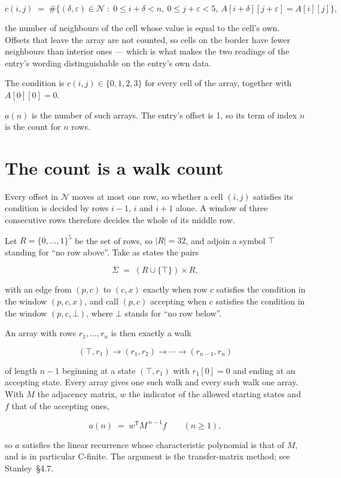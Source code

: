 \documentclass[11pt]{article}
\theoremstyle{definition}
\begin{document}
\[c(i,j) \;=\; \#\bigl\{(\delta,\varepsilon)\in\mathcal{N} \;:\; 0\le i+\delta<n,\ 0\le j+\varepsilon<5,\ A[i+\delta][j+\varepsilon] = A[i][j]\bigr\},\]

the number of neighbours of the cell whose value is equal to the cell's own. Offsets that leave the array are not counted, so cells on the border have fewer neighbours than interior ones --- which is what makes the two readings of the entry's wording distinguishable on the entry's own data.

The condition is $c(i,j) \in \{0, 1, 2, 3\}$ for every cell of the array, together with $A[0][0]=0$.

$a(n)$ is the number of such arrays. The entry's offset is 1, so its term of index $n$ is the count for $n$ rows.

\section{The count is a walk count}

Every offset in $\mathcal{N}$ moves at most one row, so whether a cell $(i,j)$ satisfies its condition is decided by rows $i-1$, $i$ and $i+1$ alone. A window of three consecutive rows therefore decides the whole of its middle row.

Let $R = \{0,\dots,1\}^{5}$ be the set of rows, so $|R| = 32$, and adjoin a symbol $\top$ standing for ``no row above''. Take as states the pairs

\[\Sigma \;=\; (R \cup \{\top\}) \times R,\]

with an edge from $(p,c)$ to $(c,x)$ exactly when row $c$ satisfies the condition in the window $(p,c,x)$, and call $(p,c)$ accepting when $c$ satisfies the condition in the window $(p,c,\bot)$, where $\bot$ stands for ``no row below''.

An array with rows $r_1,\dots,r_n$ is then exactly a walk

\[(\top,r_1) \to (r_1,r_2) \to \cdots \to (r_{n-1},r_n)\]

of length $n-1$ beginning at a state $(\top,r_1)$ with $r_1[0]=0$ and ending at an accepting state. Every array gives one such walk and every such walk one array. With $M$ the adjacency matrix, $w$ the indicator of the allowed starting states and $f$ that of the accepting ones,

\[a(n) \;=\; w^{\mathsf T} M^{\,n-1} f \qquad (n \ge 1),\]

so $a$ satisfies the linear recurrence whose characteristic polynomial is that of $M$, and is in particular C-finite. The argument is the transfer-matrix method; see Stanley~\S4.7.
\end{document}
